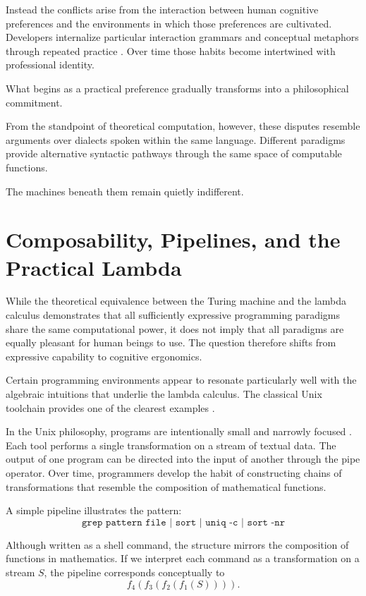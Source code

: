 \documentclass[12pt]{article}
\theoremstyle{definition}
\begin{document}
Instead the conflicts arise from the interaction between human cognitive
preferences and the environments in which those preferences are
cultivated. Developers internalize particular interaction grammars and
conceptual metaphors through repeated practice \cite{norman1988}. Over
time those habits become intertwined with professional identity.

What begins as a practical preference gradually transforms into a
philosophical commitment.

From the standpoint of theoretical computation, however, these disputes
resemble arguments over dialects spoken within the same language.
Different paradigms provide alternative syntactic pathways through the
same space of computable functions.

The machines beneath them remain quietly indifferent.

\section{Composability, Pipelines, and the Practical Lambda}

While the theoretical equivalence between the Turing machine and the
lambda calculus demonstrates that all sufficiently expressive
programming paradigms share the same computational power, it does not
imply that all paradigms are equally pleasant for human beings to use.
The question therefore shifts from expressive capability to cognitive
ergonomics.

Certain programming environments appear to resonate particularly well
with the algebraic intuitions that underlie the lambda calculus. The
classical Unix toolchain provides one of the clearest examples
\cite{ritchie1974,mcilroy1978}.

In the Unix philosophy, programs are intentionally small and narrowly
focused \cite{raymond2003}. Each tool performs a single transformation
on a stream of textual data. The output of one program can be directed
into the input of another through the pipe operator. Over time,
programmers develop the habit of constructing chains of transformations
that resemble the composition of mathematical functions.

A simple pipeline illustrates the pattern:
\[
\texttt{grep pattern file | sort | uniq -c | sort -nr}
\]

Although written as a shell command, the structure mirrors the
composition of functions in mathematics. If we interpret each command as
a transformation on a stream $S$, the pipeline corresponds conceptually
to
\[
f_4(f_3(f_2(f_1(S)))).
\]
\end{document}
